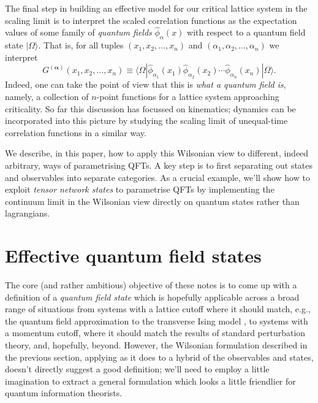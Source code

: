 \documentclass[11pt]{amsart}
\theoremstyle{plain}%
\theoremstyle{definition}
\theoremstyle{remark}
\begin{document}
The final step in building an effective model for our critical lattice system in the scaling limit is to interpret the scaled correlation functions as the expectation values of some family of \emph{quantum fields} $\widehat{\phi}_{\alpha}(x)$ with respect to a quantum field state $|\Omega\rangle$. That is, for all tuples $(x_1, x_2, \ldots, x_n)$ and $(\alpha_1, \alpha_2, \ldots, \alpha_n)$ we interpret
\begin{equation}
	G^{(\boldsymbol{\alpha})}(x_1, x_2, \ldots, x_n) \equiv \langle\Omega|\widehat{\phi}_{\alpha_1}(x_1)\widehat{\phi}_{\alpha_2}(x_2)\cdots \widehat{\phi}_{\alpha_n}(x_n)|\Omega\rangle.
\end{equation}
Indeed, one can take the point of view that this is \emph{what a quantum field is}, namely, a collection of $n$-point functions for a lattice system approaching criticality. So far this discussion has focussed on kinematics; dynamics can be incorporated into this picture by studying the scaling limit of unequal-time correlation functions in a similar way.

We describe, in this paper, how to apply this Wilsonian view to different, indeed arbitrary, ways of parametrising QFTs. A key step is to first separating out states and observables into separate categories. As a crucial example, we'll show how to exploit \emph{tensor network states} to parametrise QFTs by implementing the continuum limit in the Wilsonian view directly on quantum states rather than lagrangians.

\section{Effective quantum field states}\label{sec:effectiveqftstates}

The core (and rather ambitious) objective of these notes is to come up with a definition of a \emph{quantum field state} which is hopefully applicable across a broad range of situations from systems with a lattice cutoff where it should match, e.g., the quantum field approximation to the transverse Ising model \cite{sachdev_quantum_2011}, to systems with a momentum cutoff, where it should match the results of standard perturbation theory, and, hopefully, beyond. However, the Wilsonian formulation described in the previous section, applying as it does to a hybrid of the observables and states, doesn't directly suggest a good definition; we'll need to employ a little imagination to extract a general formulation which looks a little friendlier for quantum information theorists. 
\end{document}
